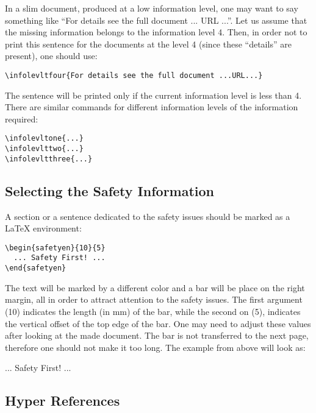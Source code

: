 \documentclass[12pt,letterpaper]{article}
\begin{document}
  In a slim document, produced at a low information level,
  one may want to say something like ``For details see the full document
  ... URL ...''. Let us assume that the missing information belongs
  to the information level 4. Then, in order not to print this sentence
  for the documents at the level 4 (since these ``details'' are
  present), one should use:
  {\color{blue}
   \begin{verbatim}
\infolevltfour{For details see the full document ...URL...}
  \end{verbatim}%
  }\noindent
  The sentence will be printed only if the current information level 
  is less than 4.
  There are similar commands for different information levels
  of the information required:
  {\color{blue}
   \begin{verbatim}
\infolevltone{...}
\infolevlttwo{...}
\infolevltthree{...}
  \end{verbatim}%
  }\noindent

\subsection{Selecting the Safety Information}
\label{sec:safety}

  A section or a sentence dedicated to the safety issues
  should be marked as a \LaTeX{} environment:
  {\color{blue}
   \begin{verbatim}
\begin{safetyen}{10}{5}
  ... Safety First! ...
\end{safetyen}
  \end{verbatim}%
  }\noindent
  The text will be marked by a different color and a bar
  will be place on the right margin, all in order to attract 
  attention to the safety issues.
  The first argument (10)
  indicates the length (in mm) of the bar, while the second on (5),
  indicates the vertical offset of the top edge of the bar.
  One may need to adjust these values after looking
  at the made document. The bar is not transferred to the next page,
  therefore one should not make it too long. The example from
  above will look as: \\
\begin{safetyen}{10}{5}
  ... Safety First! ...
\end{safetyen}

\subsection{Hyper References}
\label{sec:hyperref}
\end{document}
